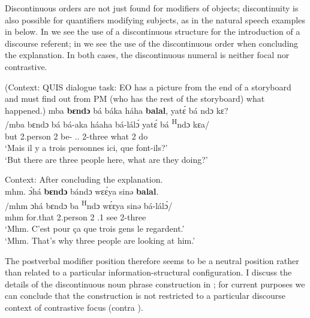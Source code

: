 \documentclass[output=paper,colorlinks,citecolor=brown
]{langscibook}
\begin{document}
\z

Discontinuous orders are not just found for modifiers of objects; discontinuity is also possible for quantifiers modifying subjects, as in the natural speech examples in  below. In  we see the use of a discontinuous structure for the introduction of a discourse referent; in  we see the use of the discontinuous order when concluding the explanation. In both cases, the discontinuous numeral is neither focal nor contrastive.

\ea \label{quistreetask} (Context: QUIS dialogue task: EO has a picture from the end of a storyboard and must find out from PM (who has the rest of the storyboard) what happened.) 
\ea
\label{quisthreementreestart}
\glll
{\db}mba \textbf{bɛndɔ} bá báka háha \textbf{balal}, yatɛ́ bá ndɔ kɛ? \\
/mba bɛndɔ bá bá-aka háaha bá-lálɔ́ yatɛ́ bá \textsuperscript{H}ndɔ kɛa/ \\
{\db}but 2.person 2\SM{} be-\DUR{} \DEM{}.\PROX{}.\LOC{} 2-three what 2\SM{} \PRS{} do \\
\glt
`Mais il y a trois personnes ici, que font-ils?' \\ `But there are three people here, what are they doing?' \jambox*{{[EO 581]}}


\ex
\label{quisthreementreeend}
Context: After concluding the explanation. \\ 
\glll
{\db}mhm. ɔ́\ds{}há \textbf{bɛndɔ} bándɔ wɛɛ́ya sinə \textbf{balal}. \\
/mhm ɔhá bɛndɔ ba \textsuperscript{H}ndɔ wɛ́ɛya sinə bá-lálɔ́/ \\
{\db}mhm for.that 2.person 2\SM{} \PRS{} \PRO{}.1{} see 2-three \\
\glt
`Mhm. C'est pour ça que trois gens le regardent.' \\ `Mhm. That's why three people are looking at him.' \jambox*{[PM 597] }

\z
\z

The postverbal modifier position therefore seems to be a neutral position rather than related to a particular information-structural configuration. I discuss the details of the discontinuous noun phrase construction in \citet[Chapter~7]{KerrFut}; for current purposes we can conclude that the construction is not restricted to a particular discourse context of contrastive focus (contra \citealt{Mous1997}).
 
\end{document}
